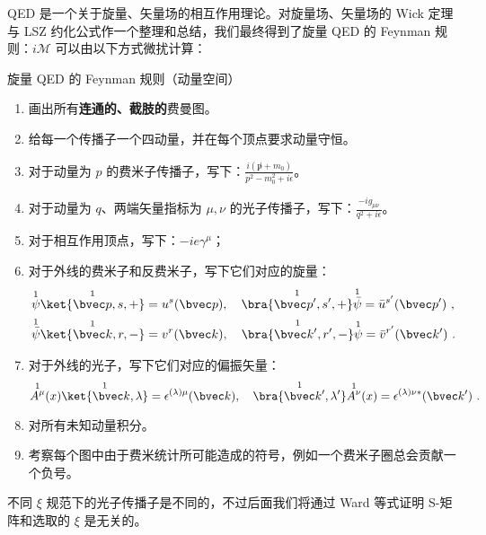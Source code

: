 QED 是一个关于旋量、矢量场的相互作用理论。对旋量场、矢量场的 Wick 定理与 LSZ 约化公式作一个整理和总结，我们最终得到了旋量 QED 的 Feynman 规则：$i\mathcal{M}$ 可以由以下方式微扰计算：
\begin{theorem}{旋量 QED 的 Feynman 规则（动量空间）}

\begin{enumerate}
\item 画出所有\textbf{连通的、截肢的}费曼图。
\item 给每一个传播子一个四动量，并在每个顶点要求动量守恒。
\item 对于动量为 $p$ 的费米子传播子，写下：$\frac{i(\not p+m_0)}{p^2-m_0^2 + i\epsilon}$。
\item 对于动量为 $q$、两端矢量指标为 $\mu,\nu$ 的光子传播子，写下：$\frac{-ig_{\mu\nu}}{q^2 + i\epsilon}$。
\item 对于相互作用顶点，写下：$-ie\gamma^\mu$；
\item 对于外线的费米子和反费米子，写下它们对应的旋量：
\begin{align*}
&\overset{1}{\psi}\overset{1}{\ket{\bvec p,s,+}}=u^s(\bvec p),\quad \overset{1}{\bra{\bvec p',s',+}} \overset{1}{\bar\psi}=\bar u^{s'}(\bvec p')~,\\
&\overset{1}{\bar\psi}\overset{1}{\ket{\bvec k,r,-}}=v^{r}(\bvec k),\quad \overset{1}{\bra{\bvec k',r',-}} \overset{1}{\psi}=\bar v^{r'}(\bvec k')~.
\end{align*}
\item 对于外线的光子，写下它们对应的偏振矢量：
\[
\overset{1}{A^\mu}(x) \overset{1}{\ket{\bvec k,\lambda}}=\epsilon^{(\lambda)\mu}(\bvec k),\quad \overset{1}{\bra{\bvec k',\lambda'}}\overset{1}{A^\nu}(x)=\epsilon^{(\lambda)\nu*}(\bvec k')~.
\]
\item 
对所有未知动量积分。
\item 
考察每个图中由于费米统计所可能造成的符号，例如一个费米子圈总会贡献一个负号。
\end{enumerate}
\end{theorem}
不同 $\xi$ 规范下的光子传播子是不同的，不过后面我们将通过 Ward 等式证明 S-矩阵和选取的 $\xi$ 是无关的。
